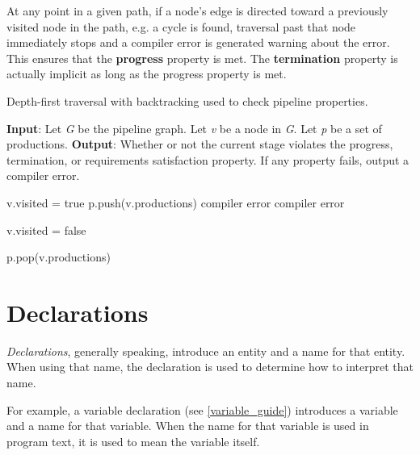 At any point in a given path, if a node's edge is directed toward a previously visited node in the path, e.g. a cycle is found, traversal past that node immediately stops and a compiler error is generated warning about the error. This ensures that the \textbf{progress} property is met. The \textbf{termination} property is actually implicit as long as the progress property is met. 

\begin{algorithm}
 \caption{Depth-first traversal with backtracking used to check pipeline properties.}
 \label{alg:dfs}
 \begin{algorithmic}
 \State
 \State \textbf{Input}: Let \textit{G} be the pipeline graph. Let \textit{v} be a node in \textit{G}. Let \textit{p} be a set of productions.
 \State \textbf{Output}: Whether or not the current stage violates the progress, termination, or requirements satisfaction property. If any property fails, output a compiler error.
 \State 
 
 	\State v.visited = true
 	\State p.push(v.productions)
 				\State {}
 			\Else
 				\State \Return compiler error
 			\EndIf
 		\EndFor
	\Else 	
 		\State \Return compiler error
 	\EndIf
 	
 	\State v.visited = false 
 	
 	\State p.pop(v.productions) 
 \EndFunction
 \end{algorithmic}
 
\end{algorithm}

\section{Declarations} \label{declaration_guide}

\textit{Declarations}, generally speaking, introduce an entity and a name for that entity. When using that name, the declaration is used to determine how to interpret that name.

For example, a variable declaration (see \ref{variable_guide}) introduces a variable and a name for that variable. When the name for that variable is used in program text, it is used to mean the variable itself.

